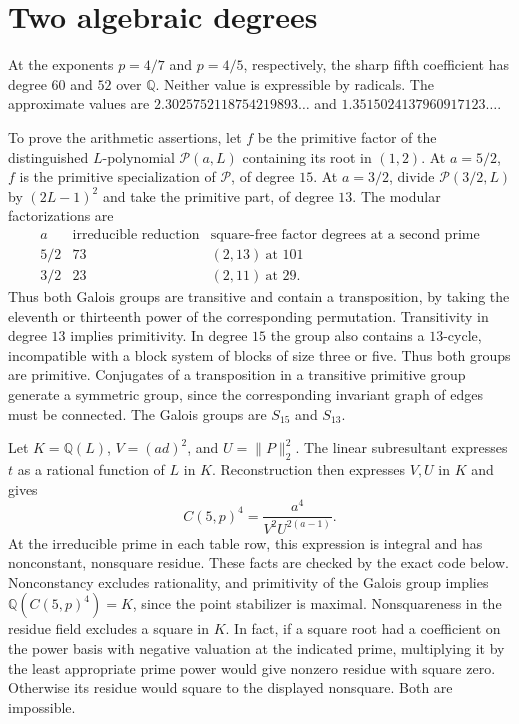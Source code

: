 \documentclass[11pt]{article}
\begin{document}
\section{Two algebraic degrees}

At the exponents \(p=4/7\) and \(p=4/5\), respectively, the
sharp fifth coefficient has degree \(60\) and \(52\) over
\(\mathbb Q\). Neither value is expressible by radicals.
The approximate values are \(2.3025752118754219893\ldots\) and
\(1.3515024137960917123\ldots\).

To prove the arithmetic assertions, let \(f\) be the primitive
factor of the distinguished \(L\)-polynomial \(\mathcal P(a,L)\)
containing its root in \((1,2)\). At \(a=5/2\), \(f\)
is the primitive specialization of \(\mathcal P\), of degree \(15\).
At \(a=3/2\), divide \(\mathcal P(3/2,L)\) by \((2L-1)^2\) and take
the primitive part, of degree \(13\).
The modular factorizations are
\[
 \begin{array}{c|c|c}
 a & \text{irreducible reduction} &
       \text{square-free factor degrees at a second prime}\\ \hline
 5/2 & 73 & (2,13)\ \text{at }101\\
 3/2 & 23 & (2,11)\ \text{at }29 .
 \end{array}
\]
Thus both Galois groups are transitive and contain a
transposition, by taking the eleventh or thirteenth power of
the corresponding permutation. Transitivity in degree \(13\)
implies primitivity. In degree \(15\) the group also contains a
\(13\)-cycle, incompatible with a block system of blocks of
size three or five. Thus both groups are primitive. Conjugates
of a transposition in a transitive primitive group generate a
symmetric group, since the corresponding invariant graph of
edges must be connected. The Galois groups are \(S_{15}\) and
\(S_{13}\).

Let \(K=\mathbb Q(L)\), \(V=(ad)^2\), and \(U=\|P\|_2^2\).
The linear subresultant expresses \(t\) as a rational function
of \(L\) in \(K\). Reconstruction then expresses \(V,U\) in
\(K\) and gives
\[
 C(5,p)^4=\frac{a^4}{V^2U^{2(a-1)}}.
\]
At the irreducible prime in each table row, this expression is
integral and has nonconstant, nonsquare residue. These facts
are checked by the exact code below. Nonconstancy excludes
rationality, and primitivity of the Galois group implies
\(\mathbb Q(C(5,p)^4)=K\), since the point stabilizer is
maximal. Nonsquareness in the residue field excludes a square
in \(K\). In fact, if a square root had a coefficient on the
power basis with negative valuation at the indicated prime,
multiplying it by the least appropriate prime power would
give nonzero residue with square zero. Otherwise its residue
would square to the displayed nonsquare. Both are impossible.
\end{document}
